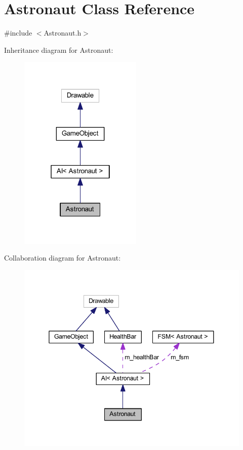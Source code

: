 \hypertarget{class_astronaut}{}\section{Astronaut Class Reference}
\label{class_astronaut}


{\ttfamily \#include $<$Astronaut.\+h$>$}



Inheritance diagram for Astronaut\+:
\nopagebreak
\begin{figure}[H]
\begin{center}
\leavevmode
\includegraphics[width=166pt]{class_astronaut__inherit__graph}
\end{center}
\end{figure}


Collaboration diagram for Astronaut\+:
\nopagebreak
\begin{figure}[H]
\begin{center}
\leavevmode
\includegraphics[width=345pt]{class_astronaut__coll__graph}
\end{center}
\end{figure}

